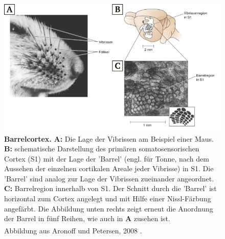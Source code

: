 \begin{figure}[H]
    \centering
    \includegraphics[width = \textwidth] {pictures/somatosensory/barrelcortex.png}
    \caption[Barrelcortex]{\textbf{Barrelcortex.} \textbf{A:} Die Lage der Vibrissen am Beispiel einer Maus. \textbf{B:} schematische Darstellung des primären somatosensorischen Cortex (S1) mit der Lage der 'Barrel' (engl. für Tonne, nach dem Aussehen der einzelnen cortikalen Areale jeder Vibrisse) in S1. Die 'Barrel' sind analog zur Lage der Vibrissen zueinander angeordnet. \textbf{C:} Barrelregion innerhalb von S1. Der Schnitt durch die 'Barrel' ist horizontal zum Cortex angelegt und mit Hilfe einer Nissl-Färbung angefärbt. Die Abbildung unten rechts zeigt erneut die Anordnung der Barrel in fünf Reihen, wie auch in \textbf{A} zusehen ist. \\
    Abbildung aus Aronoff und Petersen, 2008 \textsuperscript{\cite{barrelcortex2008}}.}
    \label{fig:barrelcortex}
\end{figure}

